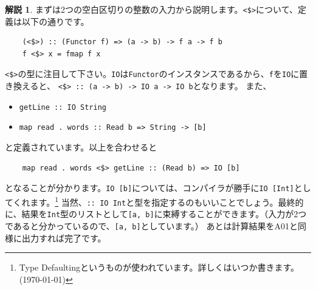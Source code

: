 \documentclass[12pt,a4paper,dvipdfmx,fleqn]{article}%
\theoremstyle{definition}
\theoremstyle{definition}
\newtheorem*{ans*}{解説}
\theoremstyle{definition}
\newcommand{\ttt}[1]{\texttt{#1}} %
\begin{document}
\begin{ans*}
    まずは2つの空白区切りの整数の入力から説明します。\ttt{<\$>}について、定義は以下の通りです。
    \begin{verbatim}
    (<$>) :: (Functor f) => (a -> b) -> f a -> f b
    f <$> x = fmap f x
    \end{verbatim}
    \vspace*{-4mm}
    \ttt{<\$>}の型に注目して下さい。\ttt{IO}は\ttt{Functor}のインスタンスであるから、\ttt{f}を\ttt{IO}に置き換えると、
    \ttt{<\$> :: (a -> b) -> IO a -> IO b}となります。
    また、
    \begin{itemize}
        \item [] \ttt{getLine :: IO String}
        \item [] \ttt{map read . words :: Read b => String -> [b]}
    \end{itemize}
    と定義されています。以上を合わせると
    \begin{verbatim}
    map read . words <$> getLine :: (Read b) => IO [b]
    \end{verbatim}
    \vspace*{-4mm}
    となることが分かります。\ttt{IO [b]}については、コンパイラが勝手に\ttt{IO [Int]}としてくれます。\footnote{Type Defaultingというものが使われています。詳しくはいつか書きます。(\today)}
    当然、\ttt{:: IO {Int}}と型を指定するのもいいことでしょう。最終的に、結果を\ttt{Int}型のリストとして\ttt{[a, b]}に束縛することができます。（\chub 入力が2つであると分かっているので、\ttt{[a, b]}としています。）
    あとは計算結果をA01と同様に出力すれば完了です。
\end{ans*}
\end{document}
